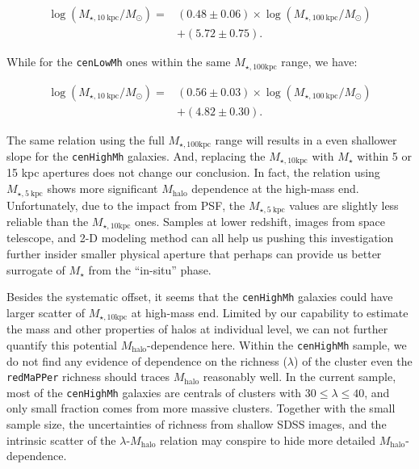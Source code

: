 \documentclass{emulateapj}
\def\redm{\texttt{redMaPPer}}
\def\rbcg{\texttt{cenHighMh}}
\def\nbcg{\texttt{cenLowMh}}
\def\mstar{{$M_{\star}$}}
\def\mhalo{{$M_{\mathrm{halo}}$}}
\def\minn{{$M_{\star,10\mathrm{kpc}}$}}
\def\mtot{{$M_{\star,100\mathrm{kpc}}$}}
\begin{document}
\begin{CJK*}{UTF8}{gbsn}
    \begin{equation}
        \begin{aligned}
        \log (M_{\star, 10\ \mathrm{kpc}}/M_{\odot}) = & (0.48\pm0.06) \times \log (M_{\star, 100\ \mathrm{kpc}}/M_{\odot}) \\ & +(5.72\pm0.75).
        \end{aligned}
    \end{equation}
    
    \noindent While for the \nbcg{} ones within the same \mtot{} range, we have:
     
    \begin{equation}
        \begin{aligned}
        \log (M_{\star, 10\ \mathrm{kpc}}/M_{\odot}) = & (0.56\pm0.03) \times \log (M_{\star, 100\ \mathrm{kpc}}/M_{\odot}) \\ & +(4.82\pm0.30).
        \end{aligned}
    \end{equation}
     
    The same relation using the full \mtot{} range will results in a even shallower 
    slope for the \rbcg{} galaxies. 
    And, replacing the \minn{} with \mstar{} within 5 or 15 kpc apertures does not change 
    our conclusion. 
    In fact, the relation using $M_{\star, 5\ \mathrm{kpc}}$ shows more significant 
    \mhalo{} dependence at the high-mass end. 
    Unfortunately, due to the impact from PSF, the $M_{\star, 5\ \mathrm{kpc}}$ values 
    are slightly less reliable than the \minn{} ones. 
    Samples at lower redshift, images from space telescope, and 2-D modeling method can 
    all help us pushing this investigation further insider smaller physical aperture 
    that perhaps can provide us better surrogate of \mstar{} from the ``in-situ'' phase.  
    
    Besides the systematic offset, it seems that the \rbcg{} galaxies could have 
    larger scatter of \minn{} at high-mass end. 
    Limited by our capability to estimate the mass and other properties of halos 
    at individual level, we can not further quantify this potential \mhalo{}-dependence 
    here.
    Within the \rbcg{} sample, we do not find any evidence of dependence on the richness 
    ($\lambda$) of the cluster even the \redm{} richness should traces \mhalo{}
    reasonably well.
    In the current sample, most of the \rbcg{} galaxies are centrals of clusters with 
    $30 \leq \lambda \leq 40$, and only small fraction comes from more massive clusters.  
    Together with the small sample size, the uncertainties of richness from shallow SDSS
    images, and the intrinsic scatter of the $\lambda$-\mhalo{} relation may conspire to 
    hide more detailed \mhalo{}-dependence.
    

\end{CJK*}
\end{document}
